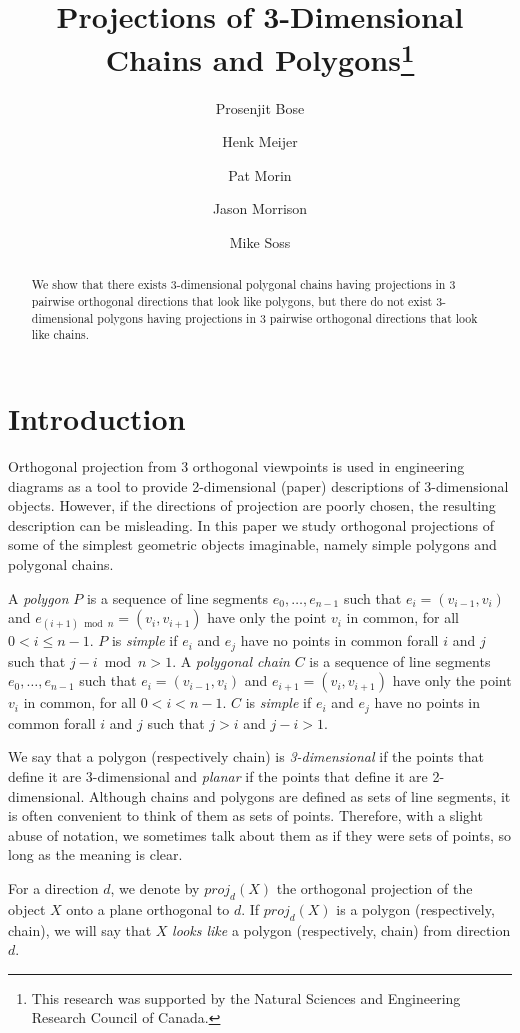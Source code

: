 \documentclass[12pt]{article}
\title{Projections of 3-Dimensional Chains and Polygons\thanks{This research was supported by the Natural Sciences and Engineering Research Council of Canada.}}
\author{Prosenjit Bose \and
	Henk Meijer \and
	Pat Morin \and
	Jason Morrison \and 
	Mike Soss}
\date{}
\newcommand{\proj}{\mathit{proj}}
\begin{document}
\maketitle

\begin{abstract}
We show that there exists 3-dimensional polygonal chains having
projections in 3 pairwise orthogonal directions that look like
polygons, but there do not exist 3-dimensional polygons having
projections in 3 pairwise orthogonal directions that look like chains.
\end{abstract}

\section{Introduction}

Orthogonal projection from 3 orthogonal viewpoints is used in
engineering diagrams as a tool to provide 2-dimensional (paper)
descriptions of 3-dimensional objects.  However, if the directions of
projection are poorly chosen, the resulting description can be
misleading.  In this paper we study orthogonal projections of some of
the simplest geometric objects imaginable, namely simple polygons and
polygonal chains.  

A {\em polygon} $P$ is a sequence of line segments
$e_0,\ldots,e_{n-1}$ such that $e_i=(v_{i-1},v_i)$ and $e_{(i+1)\bmod
n}=(v_{i},v_{i+1})$ have only the point $v_i$ in common, for all $0 <
i\le n-1$. $P$ is {\em simple} if $e_i$ and $e_j$ have no points in
common forall $i$ and $j$ such that $j-i\bmod n > 1$.  A {\em
polygonal chain} $C$ is a sequence of line segments
$e_{0},\ldots,e_{n-1}$ such that $e_i=(v_{i-1},v_i)$ and
$e_{i+1}=(v_{i},v_{i+1})$ have only the point $v_i$ in common, for all
$0< i< n-1$.  $C$ is {\em simple} if $e_i$ and $e_j$ have no points in
common forall $i$ and $j$ such that $j>i$ and $j-i > 1$.

We say that a polygon (respectively chain) is {\em 3-dimensional} if
the points that define it are 3-dimensional and {\em planar} if the
points that define it are 2-dimensional.  Although chains and polygons
are defined as sets of line segments, it is often convenient to think
of them as sets of points.  Therefore, with a slight abuse of
notation, we sometimes talk about them as if they were sets of points,
so long as the meaning is clear.

For a direction $d$, we denote by $\proj_d(X)$ the orthogonal
projection of the object $X$ onto a plane orthogonal to $d$.  If
$\proj_d(X)$ is a polygon (respectively, chain), we will say that $X$
{\em looks like} a polygon (respectively, chain) from direction $d$.
\end{document}
